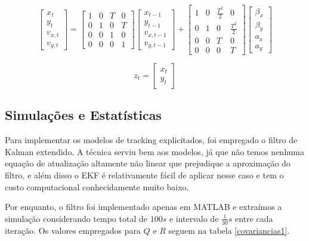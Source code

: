 \documentclass[a4paper,11pt]{article}
\begin{document}
\begin{equation}
    \begin{bmatrix} x_t \\ y_t \\ v_{x,t} \\ v_{y,t} \end{bmatrix}
    =
    \begin{bmatrix} 1 & 0 & T & 0 \\ 0 & 1 & 0 & T \\ 0 & 0 & 1 & 0 \\ 0 & 0 & 0 & 1 \end{bmatrix}
    \begin{bmatrix} x_{t-1} \\ y_{t-1} \\ v_{x,t-1} \\ v_{y,t-1} \end{bmatrix}
    +
    \begin{bmatrix} 1 & 0 & \frac{T^2}{2} & 0 \\ 0 & 1 & 0 & \frac{T^2}{2} \\ 0 & 0 & T & 0 \\ 0 & 0 & 0 & T \end{bmatrix}
    \begin{bmatrix} \beta_x \\ \beta_y \\ a_x \\ a_y \end{bmatrix}
\end{equation}

\begin{equation}
    z_t = \begin{bmatrix} x_t \\ y_t \end{bmatrix}
\end{equation}

\subsection{Simulações e Estatísticas}

Para implementar os modelos de tracking explicitados, foi empregado o filtro de Kalman extendido. A técnica serviu bem aos modelos, já que não temos nenhuma equação de atualização altamente não linear que prejudique a aproximação do filtro, e além disso o EKF é relativamente fácil de aplicar nesse caso e tem o custo computacional conhecidamente muito baixo.

Por enquanto, o filtro foi implementado apenas em MATLAB e extraímos a simulação considerando tempo total de $100s$ e intervalo de $\frac{1}{30}s$ entre cada iteração. Os valores empregados para $Q$ e $R$ seguem na tabela \ref{covariancias1}.
\end{document}
